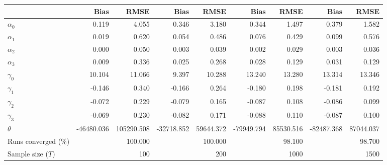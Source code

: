 
\begin{tabular}[t]{lrrrrrrrr}
\toprule
  & Bias & RMSE & Bias & RMSE & Bias & RMSE & Bias & RMSE\\
\midrule
$\alpha_{0}$ & 0.119 & 4.055 & 0.346 & 3.180 & 0.344 & 1.497 & 0.379 & 1.582\\
$\alpha_{1}$ & 0.019 & 0.620 & 0.054 & 0.486 & 0.076 & 0.429 & 0.099 & 0.576\\
$\alpha_{2}$ & 0.000 & 0.050 & 0.003 & 0.039 & 0.002 & 0.029 & 0.003 & 0.036\\
$\alpha_{3}$ & 0.009 & 0.336 & 0.025 & 0.268 & 0.028 & 0.129 & 0.031 & 0.129\\
$\gamma_{0}$ & 10.104 & 11.066 & 9.397 & 10.288 & 13.240 & 13.280 & 13.314 & 13.346\\
$\gamma_{1}$ & -0.146 & 0.340 & -0.166 & 0.264 & -0.180 & 0.198 & -0.181 & 0.192\\
$\gamma_{2}$ & -0.072 & 0.229 & -0.079 & 0.165 & -0.087 & 0.108 & -0.086 & 0.099\\
$\gamma_{3}$ & -0.069 & 0.230 & -0.082 & 0.171 & -0.088 & 0.110 & -0.087 & 0.100\\
$\theta$ & -46480.036 & 105290.508 & -32718.852 & 59644.372 & -79949.794 & 85530.516 & -82487.368 & 87044.037\\
Runs converged (\%) &  & 100.000 &  & 100.000 &  & 98.100 &  & 98.700\\
Sample size ($T$) &  & 100 &  & 200 &  & 1000 &  & 1500\\
\bottomrule
\end{tabular}
